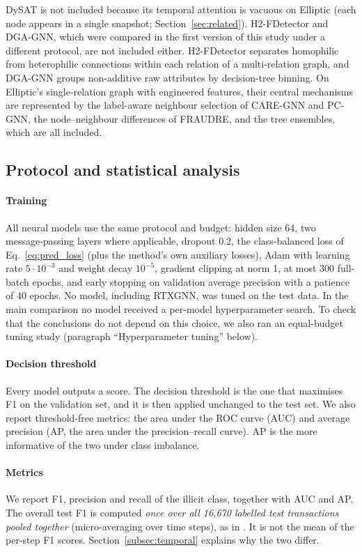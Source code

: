 DySAT is not included because its temporal attention is vacuous on Elliptic (each node appears in a single snapshot; Section~\ref{sec:related}). H2-FDetector and DGA-GNN, which were compared in the first version of this study under a different protocol, are not included either. H2-FDetector separates homophilic from heterophilic connections within each relation of a multi-relation graph, and DGA-GNN groups non-additive raw attributes by decision-tree binning. On Elliptic's single-relation graph with engineered features, their central mechanisms are represented by the label-aware neighbour selection of CARE-GNN and PC-GNN, the node--neighbour differences of FRAUDRE, and the tree ensembles, which are all included.

\subsection{Protocol and statistical analysis}
\label{subsec:protocol}

\paragraph{Training} All neural models use the same protocol and budget: hidden size 64, two message-passing layers where applicable, dropout 0.2, the class-balanced loss of Eq.~\eqref{eq:pred_loss} (plus the method's own auxiliary losses), Adam with learning rate $5\cdot10^{-3}$ and weight decay $10^{-5}$, gradient clipping at norm 1, at most 300 full-batch epochs, and early stopping on validation average precision with a patience of 40 epochs. No model, including RTXGNN, was tuned on the test data. In the main comparison no model received a per-model hyperparameter search. To check that the conclusions do not depend on this choice, we also ran an equal-budget tuning study (paragraph ``Hyperparameter tuning'' below).

\paragraph{Decision threshold} Every model outputs a score. The decision threshold is the one that maximises F1 on the validation set, and it is then applied unchanged to the test set. We also report threshold-free metrics: the area under the ROC curve (AUC) and average precision (AP, the area under the precision--recall curve). AP is the more informative of the two under class imbalance.

\paragraph{Metrics} We report F1, precision and recall of the illicit class, together with AUC and AP. The overall test F1 is computed \emph{once over all 16,670 labelled test transactions pooled together} (micro-averaging over time steps), as in \citet{weber2019anti}. It is not the mean of the per-step F1 scores. Section~\ref{subsec:temporal} explains why the two differ.


